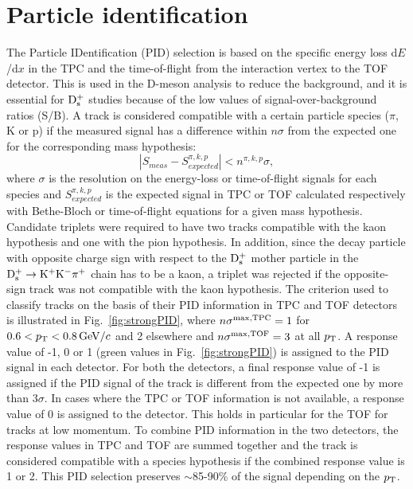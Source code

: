 \section{Particle identification}
\label{Sec:PID}
The Particle IDentification (PID) selection is based on the specific energy loss 
d$E$/d$x$ in the TPC and the time-of-flight from the interaction vertex to the 
TOF detector. This is used in the D-meson analysis to reduce the background, 
and it is essential for ${\rm D_s^+}$ studies because of the low values of signal-over-background
 ratios (S/B).
A track is  considered compatible with a certain particle species 
($\pi$, K or p) if the measured signal has a difference 
within $n\sigma$ from the expected one for the corresponding mass hypothesis:
\[
|S_{meas}-S^{\pi,k,p}_{expected}| < n^{\pi,k,p}\sigma ,
\]
where $\sigma$ is the resolution on the energy-loss or time-of-flight signals for each species
and $S^{\pi,k,p}_{expected}$ is the expected signal in TPC or TOF
calculated respectively with Bethe-Bloch or time-of-flight equations for a given mass hypothesis.
Candidate triplets were required to have two tracks compatible with 
the kaon hypothesis and one with the pion hypothesis. In addition, 
since the decay particle with opposite charge sign with respect to the ${\rm D_s^+}$
mother particle in the ${\rm D^{+}_\mathrm{s}\to K^+ K^-\pi^+}$ chain has to be a kaon, 
a triplet was rejected if the opposite-sign track was not compatible 
with the kaon hypothesis. 
The criterion used to classify tracks on the basis of their PID
information in TPC and TOF detectors is 
illustrated in Fig.~\ref{fig:strongPID}, where $n\sigma^{\rm max,TPC} = 1$ for
$0.6 < p_{\rm T} < 0.8 \, \mathrm{GeV}/c$ and 2 elsewhere and $n\sigma^{\rm max,TOF} = 3$ at all $p_{\rm T}$.  
A response value of -1, 0 or 1 (green values in Fig.~\ref{fig:strongPID}) 
is assigned to the PID signal in each
detector. For both the detectors, a final response value of -1 is assigned   
if the PID signal of the track is different from the expected one
by more than 3$\sigma$. In cases where the TPC or TOF information is not
available, a response value of 0 is assigned
to the detector. This holds in particular for the TOF for tracks at low momentum.  
To combine PID information in the two detectors,
the response values in TPC and TOF 
are summed together and the track is considered
compatible with a species hypothesis if the combined response value is 1 or 2. This
PID selection preserves $\sim$85-90\% of the signal depending on the $p_{\rm T}$.

